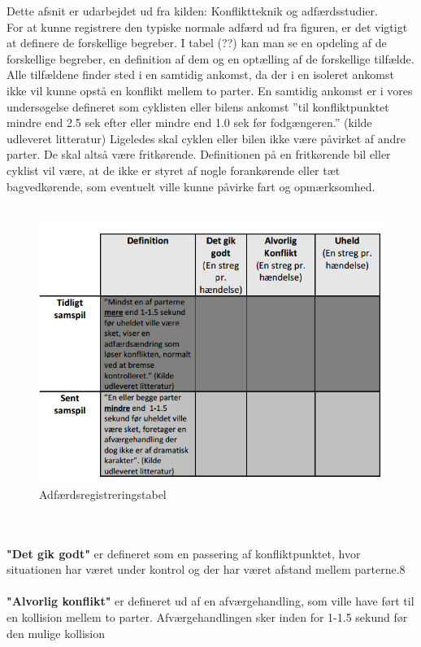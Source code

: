 Dette afsnit er udarbejdet ud fra kilden: Konfliktteknik	og	adfærdsstudier.
\\
For	at kunne registrere den typiske normale adfærd ud	 fra figuren, er det vigtigt at definere	de	forskellige	begreber. I tabel (??) kan man se en	opdeling af de forskellige begreber, en definition af dem og en optælling af de forskellige tilfælde. Alle	tilfældene finder sted i	en samtidig ankomst, da der i en isoleret ankomst	 ikke vil kunne	opstå en konflikt mellem to parter. En samtidig ankomst er i vores undersøgelse defineret som cyklisten eller bilens ankomst ”til konfliktpunktet mindre end 2.5 sek efter eller mindre end 1.0 sek før fodgængeren.” (kilde udleveret	litteratur)	Ligeledes skal cyklen	eller bilen ikke være påvirket af andre parter. De skal altså være fritkørende. Definitionen på en fritkørende bil eller cyklist	vil	være, at de ikke er styret af nogle	forankørende eller tæt bagvedkørende, som eventuelt ville kunne påvirke fart og opmærksomhed.
\\\\
\begin{figure}[htbp]
  \label{fig:adfregtabel}
  \centering
  \begin{adjustbox}{max width=\textwidth}
    \includegraphics{billederogfigur/obstabel.png} %
 \end{adjustbox}
  \caption{Adfærdsregistreringstabel}
\end{figure}
\\\\
\textbf{"Det	gik	godt"} er defineret som en passering af konfliktpunktet, hvor situationen
har	været under kontrol og der har været afstand mellem parterne.8
\\\\
\textbf{"Alvorlig konflikt"}	er defineret ud af en afværgehandling, som ville have ført til en kollision mellem to parter. Afværgehandlingen sker inden for 1-1.5 sekund før den mulige	kollision%

